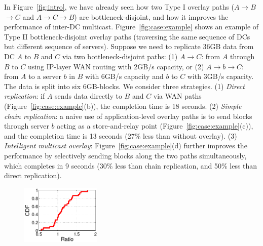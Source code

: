 In Figure~\ref{fig:intro}, we have already seen how two Type I overlay
paths ($A$$\rightarrow$$B$$\rightarrow$$C$ and
$A$$\rightarrow$$C$$\rightarrow$$B$) are bottleneck-disjoint,
and how it improves the performance of inter-DC multicast.
Figure~\ref{fig:case:example} shows an example
of Type II bottleneck-disjoint overlay paths
(traversing the same sequence of DCs but different sequence of
servers). Suppose we need to replicate 36GB data from DC $A$
to $B$ and $C$ via two bottleneck-disjoint paths:
(1) $A$$\rightarrow$$C$:
from $A$ through $B$ to $C$ using IP-layer WAN routing with
2GB/s capacity, or
(2) $A$$\rightarrow$$b$$\rightarrow$$C$: from $A$ to a server
$b$ in $B$ with
6GB/s capacity and $b$ to $C$ with 3GB/s capacity.
The data is split into six 6GB-blocks.
We consider three strategies.
(1) {\em Direct replication}:
if $A$ sends data directly to $B$ and $C$ via WAN paths
(Figure~\ref{fig:case:example}(b)),
the completion time is 18 seconds.
(2) {\em Simple chain replication}:
a naive use of application-level overlay paths
is to send blocks through server $b$ acting as a
store-and-relay point
(Figure~\ref{fig:case:example}(c)),
and the completion time is 13 seconds (27\% less than without overlay).
(3) {\em Intelligent multicast overlay}:
Figure~\ref{fig:case:example}(d) further improves the performance by
selectively sending blocks along the two paths simultaneously,
which completes in 9 seconds (30\% less than chain replication,
and 50\% less than direct replication).



\begin{figure}[t]
\centering
\includegraphics[width=1.5in]{images/potential_v2.eps}%
\label{fig:case:size}
\vspace{-0.4cm}
\end{figure}

